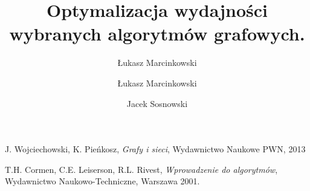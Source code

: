 \documentclass[12pt,oneside,a4paper]{article}
\begin{document}
\author{Łukasz Marcinkowski}
\author{Łukasz Marcinkowski \and Jacek Sosnowski}
\title{Optymalizacja wydajności wybranych algorytmów grafowych.}
\maketitle



\pagebreak

\pagebreak


\pagebreak

\begin{thebibliography}{9}

 J. Wojciechowski, K. Pieńkosz, \emph{Grafy i sieci}, Wydawnictwo Naukowe PWN, 2013

 T.H. Cormen, C.E. Leiserson, R.L. Rivest, \emph{Wprowadzenie do algorytmów}, Wydawnictwo
Naukowo-Techniczne, Warszawa 2001.

\end{thebibliography}
\end{document}
